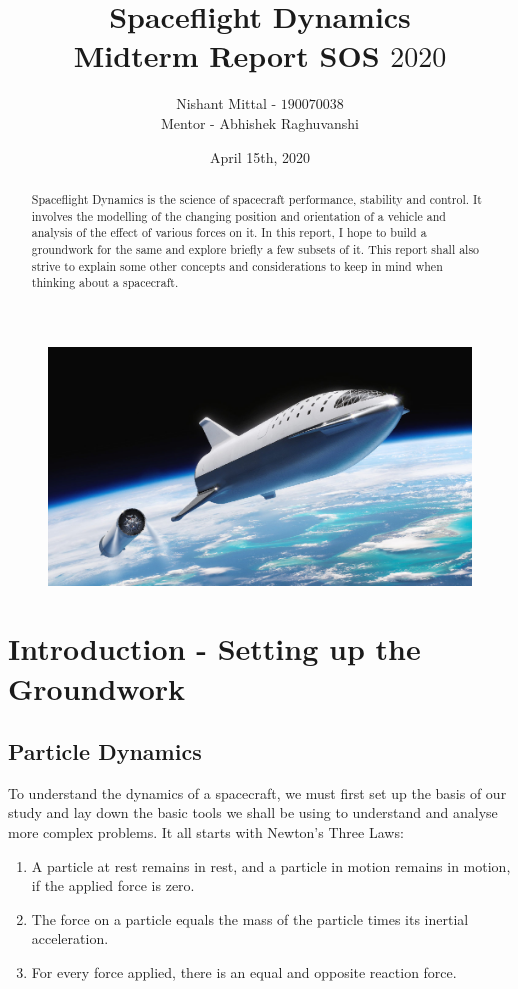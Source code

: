 \documentclass[12pt, letterpaper]{article}
\title{\textbf{Spaceflight Dynamics}\\ 
 		\large{Midterm Report SOS $2020$}}
\author{Nishant Mittal - $190070038$\\
Mentor - Abhishek Raghuvanshi}
\date{April 15th, 2020}
\begin{document}
\setlength{\parindent}{0pt}
\maketitle

\begin{figure}[h]
	\centering
    \includegraphics[width=\textwidth]{cover}
\end{figure}

\begin{abstract}
Spaceflight Dynamics is the science of spacecraft performance, stability and control. It involves the modelling of the changing position and orientation of a vehicle and analysis of the effect of various forces on it. In this report, I hope to build a groundwork for the same and explore briefly a few subsets of it. This report shall also strive to explain some other concepts and considerations to keep in mind when thinking about a spacecraft.
\end{abstract}

\newpage
\tableofcontents

\newpage
\section{Introduction - Setting up the Groundwork}
\subsection{Particle Dynamics}
To understand the dynamics of a spacecraft, we must first set up the basis of our study and lay down the basic tools we shall be using to understand and analyse more complex problems. It all starts with Newton's Three Laws:
\begin{enumerate}

	\item A particle at rest remains in rest, and a particle in motion remains in motion, if the applied force is zero.
	\item The force on a particle equals the mass of the particle times its inertial acceleration.
	\item For every force applied, there is an equal and opposite reaction force.

\end{enumerate}
\end{document}
